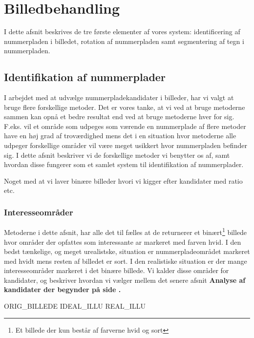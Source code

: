 \section{Billedbehandling}

I dette afsnit beskrives de tre første elementer af vores system: identificering af nummerpladen i billedet, rotation af nummerpladen samt segmentering af tegn i nummerpladen.


\subsection{Identifikation af nummerplader}
I arbejdet med at udvælge nummerpladekandidater i billeder, har vi valgt at bruge flere forskellige metoder. Det er vores tanke, at vi ved at bruge metoderne sammen kan opnå et bedre resultat end ved at bruge metoderne hver for sig. F.eks. vil et område som udpeges som værende en nummerplade af flere metoder have en høj grad af troværdighed mens det i en situation hvor metoderne alle udpeger forskellige områder vil være meget usikkert hvor nummerpladen befinder sig. I dette afsnit beskriver vi de forskellige metoder vi benytter os af, samt hvordan disse fungerer som et samlet system til identifikation af nummerplader. 

Noget med at vi laver binære billeder hvori vi kigger efter kandidater med ratio etc.


\subsubsection*{Interesseområder}
Metoderne i dette afsnit, har alle det til fælles at de returnerer et binært\footnote{Et billede der kun består af farverne hvid og sort} billede hvor områder der opfattes som interessante ar markeret med farven hvid. I den bedst tænkelige, og meget urealistske, situation er nummerpladeområdet markeret med hvidt mens resten af billedet er sort. I den realistiske situation er der mange interesseområder markeret i det binære billede. Vi kalder disse områder for kandidater, og beskriver hvordan vi vælger mellem det senere afsnit \bf{Analyse af kandidater} der begynder på side \pageref{sec_kandidater}.

ORIG_BILLEDE IDEAL_ILLU REAL_ILLU




